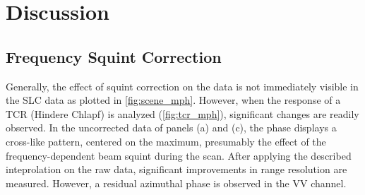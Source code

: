 \section{Discussion}\label{sec:discussion}
\subsection{Frequency Squint Correction}\label{sec:discussion:squint_correction}
Generally, the effect of squint correction on the data is not immediately visible in the SLC data as plotted in \autoref{fig:scene_mph}. However, when the response of a TCR (Hindere Chlapf) is analyzed (\autoref{fig:tcr_mph}), significant changes are readily observed.
In the uncorrected data of panels (a) and (c), the phase displays a cross-like pattern, centered on the maximum, presumably the effect of the frequency-dependent beam squint during the scan. After applying the described inteprolation on the raw data, significant improvements in range resolution are measured. However, a residual azimuthal phase is observed in the VV channel.
